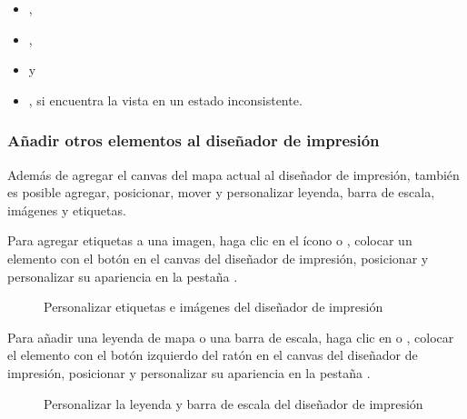 \begin{itemize}
\item {},
\item {},
\item {} y
\item {}, si encuentra la vista en un estado inconsistente.
\end{itemize}


\subsubsection{Añadir otros elementos al diseñador de impresión} 

Además de agregar el canvas del mapa actual al diseñador de impresión, también es posible 
agregar, posicionar, mover y personalizar leyenda, barra de escala, imágenes y etiquetas.


Para agregar etiquetas a una imagen, haga clic en el ícono  o 
, colocar un elemento con
el botón en el canvas del diseñador de impresión, posicionar y personalizar
su apariencia en la pestaña . 

\begin{figure}[ht]
\centering
\caption{Personalizar etiquetas e imágenes del diseñador de impresión \nixcaption}\label{fig:print_composer_tab2}
   \goodgap
\end{figure}


Para añadir una leyenda de mapa o una barra de escala, haga clic en  o 
, colocar el elemento con el botón izquierdo del ratón en el canvas del diseñador de impresión, posicionar y personalizar su apariencia en la pestaña .

\begin{figure}[ht]
\centering
\caption{Personalizar la leyenda y barra de escala del diseñador de impresión \nixcaption}\label{fig:print_composer_tab1}
   \goodgap
\end{figure}


